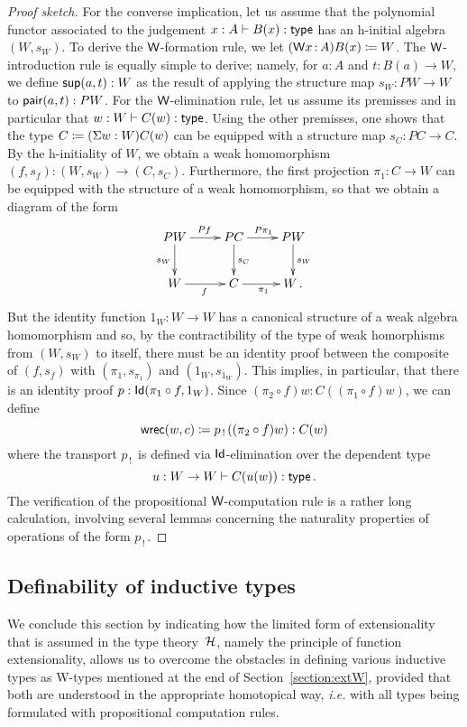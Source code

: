 \begin{proof}[Proof sketch]
For the converse implication, let us assume that the polynomial functor associated
to the judgement $x : A \vdash B(x) : \mathsf{type}$ 
has an h-initial algebra $(W,s_W)$. To derive the $\mathsf{W}$-formation rule, we 
let  $(\mathsf{W} x {\, : \, } A) B(x) \coloneqq W$. The $\mathsf{W}$-introduction rule is equally simple to
derive; namely, for $a : A$ and $t \colon B(a) \rightarrow W$,  we define $\mathsf{sup}(a,t) : W$ as the 
result of applying the structure map $s_W \colon PW \rightarrow W$ to $\mathsf{pair}(a,t) : PW$.
For the $\mathsf{W}$-elimination rule, let us assume its premisses and in particular that $w : W \vdash C(w) : \mathsf{type}$.
Using the other premisses, one shows that the type $C \coloneqq (\Sigma w : W) C(w)$
can be equipped with a structure map $s_C : PC \rightarrow C$. By the h-initiality of $W$,
we obtain a weak homomorphism $(f, s_f) : (W, s_W) \rightarrow (C, s_C)$. Furthermore,
the first projection $\pi_1 : C \rightarrow W$ can be equipped with the structure of a weak 
homomorphism, so that we obtain a diagram of the form
\[
\xymatrix{
PW \ar[r]^{Pf} \ar[d]_{s_W}  & PC \ar[d]^{s_C}  \ar[r]^{P \pi_1}  & PW  \ar[d]^{s_W}  \\
W \ar[r]_f  & C \ar[r]_{\pi_1}  & W \, .}
\]
But the identity function $1_W : W \rightarrow W$ has a canonical structure of a weak
algebra homomorphism and so, by the contractibility of the type of weak homorphisms
from $(W,s_W)$ to itself, there must be an identity proof between the composite
of $(f,s_f)$ with $(\pi_1, s_{\pi_1})$ and $(1_W, s_{1_W})$. This implies, in particular,
that there is an identity proof $p : \mathsf{Id}( \pi_1 \circ f, 1_W)$. 
Since $(\pi_2 \circ f) w : C( (\pi_1 \circ f) w)$, we can define
\[
\mathsf{wrec}(w,c) \coloneqq
p_{\, ! \,}( ( \pi_2 \circ  f)   w )   : C(w) 
\]
where the transport $p_{\, ! \,}$ is defined via $\mathsf{Id}$-elimination over the dependent type
\[
u : W \rightarrow W \vdash C ( u (w)) : \mathsf{type} \, .
\]
The verification of the propositional $\mathsf{W}$-computation rule is a rather long calculation,
involving several lemmas concerning the naturality properties of operations of the form $p_{\, ! \,}$.
\end{proof}

\subsection{Definability of inductive types}\label{subsec:define}

\noindent We conclude this section by indicating how the limited form of extensionality that is assumed in the type theory~$\mathcal{H}$, namely the principle of function extensionality, allows us to overcome the obstacles in defining various inductive types as W-types mentioned at the end of Section~\ref{section:extW}, provided that both are understood in the appropriate homotopical way, \emph{i.e.} with all types being formulated with propositional computation rules. 

